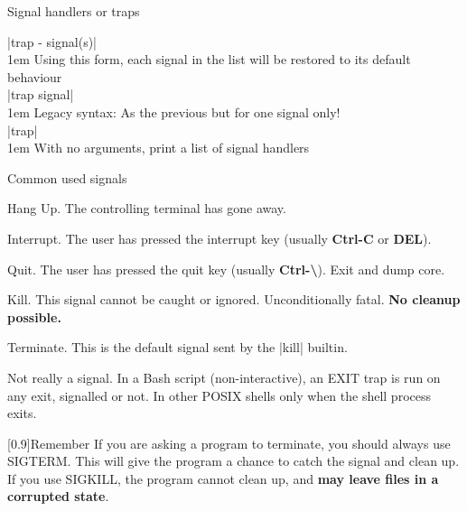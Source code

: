 \begin{frame}{Signal handlers or traps}
\begin{onlyenv}
        \endgroup
        \colorbox{background-color}{\bash|trap - signal(s)|}\\[0.3em]
        \begingroup\leftskip1em
            Using this form, each signal in the list will be restored to its default behaviour\\[0.4em]
        \endgroup
        \colorbox{background-color}{\bash|trap signal|}\\[0.3em]
        \begingroup\leftskip1em
            Legacy syntax: As the previous but for one signal only!\\[0.4em]
        \endgroup
        \colorbox{background-color}{\bash|trap|}\\[0.3em]
        \begingroup\leftskip1em
            With no arguments, print a list of signal handlers\\
        \endgroup
    \end{onlyenv}
\end{frame}
\begin{frame}{Common used signals}
    \begin{description}[TERMX]
        \item[\textbf{HUP}] Hang Up. The controlling terminal has gone away.
        \item[\textbf{INT}] Interrupt. The user has pressed the interrupt key (usually \textbf{Ctrl-C} or \textbf{DEL}).
        \item[\textbf{QUIT}] Quit. The user has pressed the quit key (usually \textbf{Ctrl-\textbackslash}). Exit and dump core.
        \item[\textbf{KILL}] Kill. \alert{This signal cannot be caught or ignored.} Unconditionally fatal. \textbf{\textbf{No cleanup possible.}}
        \item[\textbf{TERM}] Terminate. This is the default signal sent by the \bash|kill| builtin.
        \item[\textbf{EXIT}] Not really a signal. In a Bash script (non-interactive), an EXIT trap is run on any exit, signalled or not. In other POSIX shells only when the shell process exits.
    \end{description}
    \begin{varblock}{}[0.9\textwidth]{Remember}
        If you are asking a program to terminate, you should always use SIGTERM. %
        This will give the program a chance to catch the signal and clean up.
        If you use SIGKILL, the program cannot clean up, and \textbf{may leave files in a corrupted state}.
    \end{varblock}
\end{frame}
